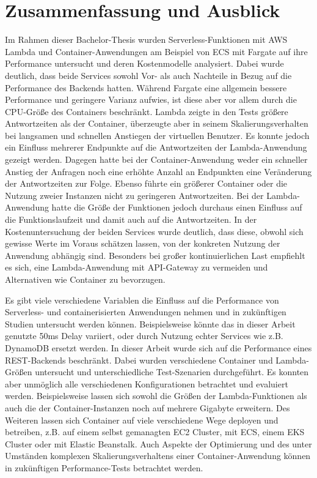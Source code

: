 \chapter{Zusammenfassung und Ausblick}
Im Rahmen dieser Bachelor-Thesis wurden Serverless-Funktionen mit \ac{AWS} Lambda und Container-Anwendungen am Beispiel von \ac{ECS} mit Fargate auf ihre Performance untersucht und deren Kostenmodelle analysiert. Dabei wurde deutlich, dass beide Services sowohl Vor- als auch Nachteile in Bezug auf die Performance des Backends hatten. Während Fargate eine allgemein bessere Performance und geringere Varianz aufwies, ist diese aber vor allem durch die CPU-Größe des Containers beschränkt. Lambda zeigte in den Tests größere Antwortzeiten als der Container, überzeugte aber in seinem Skalierungsverhalten bei langsamen und schnellen Anstiegen der virtuellen Benutzer. Es konnte jedoch ein Einfluss mehrerer Endpunkte auf die Antwortzeiten der Lambda-Anwendung gezeigt werden. Dagegen hatte bei der Container-Anwendung weder ein schneller Anstieg der Anfragen noch eine erhöhte Anzahl an Endpunkten eine Veränderung der Antwortzeiten zur Folge. Ebenso führte ein größerer Container oder die Nutzung zweier Instanzen nicht zu geringeren Antwortzeiten. Bei der Lambda-Anwendung hatte die Größe der Funktionen jedoch durchaus einen Einfluss auf die Funktionslaufzeit und damit auch auf die Antwortzeiten.
In der Kostenuntersuchung der beiden Services wurde deutlich, dass diese, obwohl sich gewisse Werte im Voraus schätzen lassen, von der konkreten Nutzung der Anwendung abhängig sind. Besonders bei großer kontinuierlichen Last empfiehlt es sich, eine Lambda-Anwendung mit API-Gateway zu vermeiden und Alternativen wie Container zu bevorzugen.

Es gibt viele verschiedene Variablen die Einfluss auf die Performance von Serverless- und containerisierten Anwendungen nehmen und in zukünftigen Studien untersucht werden können. Beispielsweise könnte das in dieser Arbeit genutzte 50ms Delay variiert, oder durch Nutzung echter Services wie z.B. DynamoDB ersetzt werden. In dieser Arbeit wurde sich auf die Performance eines REST-Backends beschränkt. Dabei wurden verschiedene Container und Lambda-Größen untersucht und unterschiedliche Test-Szenarien durchgeführt. Es konnten aber unmöglich alle verschiedenen Konfigurationen betrachtet und evaluiert werden. Beispielsweise lassen sich sowohl die Größen der Lambda-Funktionen als auch die der Container-Instanzen noch auf mehrere Gigabyte erweitern. Des Weiteren lassen sich Container auf viele verschiedene Wege deployen und betreiben, z.B. auf einem selbst gemanagten \ac{EC2} Cluster, mit \ac{ECS}, einem \ac{EKS} Cluster oder mit Elastic Beanstalk. Auch Aspekte der Optimierung und des unter Umständen komplexen Skalierungsverhaltens einer Container-Anwendung können in zukünftigen Performance-Tests betrachtet werden.

